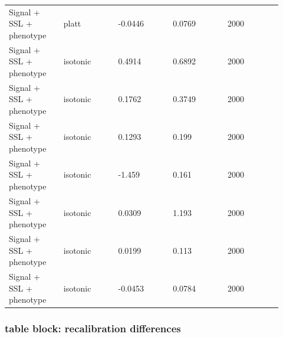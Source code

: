 \documentclass[utf8]{frontiers_suppmat}
\begin{document}
\begin{landscape}
\begin{longtable}{L{0.184\linewidth} L{0.184\linewidth} L{0.184\linewidth} L{0.184\linewidth} L{0.184\linewidth}}
Signal + SSL + phenotype & platt & -\allowbreak{}0.\allowbreak{}0446 & 0.\allowbreak{}0769 & 2000 \\
Signal + SSL + phenotype & isotonic & 0.\allowbreak{}4914 & 0.\allowbreak{}6892 & 2000 \\
Signal + SSL + phenotype & isotonic & 0.\allowbreak{}1762 & 0.\allowbreak{}3749 & 2000 \\
Signal + SSL + phenotype & isotonic & 0.\allowbreak{}1293 & 0.\allowbreak{}199 & 2000 \\
Signal + SSL + phenotype & isotonic & -\allowbreak{}1.\allowbreak{}459 & 0.\allowbreak{}161 & 2000 \\
Signal + SSL + phenotype & isotonic & 0.\allowbreak{}0309 & 1.\allowbreak{}193 & 2000 \\
Signal + SSL + phenotype & isotonic & 0.\allowbreak{}0199 & 0.\allowbreak{}113 & 2000 \\
Signal + SSL + phenotype & isotonic & -\allowbreak{}0.\allowbreak{}0453 & 0.\allowbreak{}0784 & 2000 \\
\end{longtable}
\normalsize
\end{landscape}


\subsubsection*{table block: recalibration differences}
\end{document}
